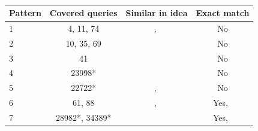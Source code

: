 \begin{table}[tbp]
\inv
\small
\centering
\setlength{\tabcolsep}{6pt}
\def\arraystretch{1.2}

\begin{tabular}{ l | c c c }
\toprule
Pattern& Covered queries & Similar in idea & Exact match \\
\midrule
1 & 4, 11, 74 & ~\cite{blitz2}, ~\cite{bruno2022computation} & No \\
2 & 10, 35, 69 & ~\cite{begoli2018apache} & No \\
3 & 41 & ~\cite{begoli2018apache} & No \\
4 & 23998* &  & No \\
5 & 22722* & ~\cite{sarthi2020generalized}, ~\cite{bruno2022computation} & No \\
6 & 61, 88 & ~\cite{sarthi2020generalized}, ~\cite{bruno2022computation} & Yes,~\cite{bruno2022computation}  \\
7 & 28982*, 34389* & ~\cite{begoli2018apache} & Yes,~\cite{begoli2018apache}  \\
\bottomrule
\end{tabular}
\captionsetup{font=small,name=Table}
\caption{  }
\inv
\label{gen:tab:pattern-summary}
\end{table}


















